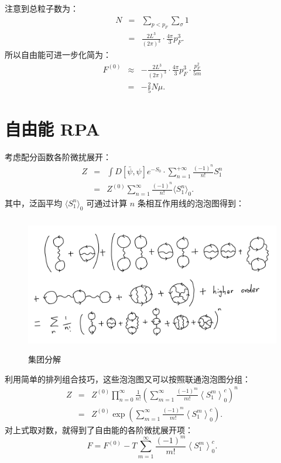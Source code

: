 \documentclass[10pt,UTF8]{ctexart}
\begin{document}
注意到总粒子数为：
\begin{eqnarray}
	N & = & \sum_{p<p_{F}}\sum_{\sigma}1\\
 	& = & \frac{2L^{3}}{\left(2\pi\right)^{3}}\cdot\frac{4\pi}{3}p_{F}^{3}.
\end{eqnarray}
所以自由能可进一步化简为：
\begin{eqnarray}
	F^{\left(0\right)} 
	& \approx & -\frac{2L^{3}}{\left(2\pi\right)^{3}}\cdot\frac{4\pi}{3}p_{F}^{3}\cdot\frac{p_{F}^{2}}{5m}\\
 	& = & -\frac{2}{5}N\mu.
\end{eqnarray}


\section*{自由能 RPA}
\noindent
考虑配分函数各阶微扰展开：
\begin{eqnarray}
	Z &=& \int D[\bar\psi,\psi] e^{-S_{0}}\cdot\sum_{n=1}^{+\infty}\frac{(-1)^n}{n!}S_1^n \\
	&=& Z^{(0)}\sum_{n=1}^{\infty} \frac{(-1)^n}{n!} \langle S_1^n \rangle_0.
\end{eqnarray}
其中，泛函平均 $\langle S_1^n \rangle_0$ 可通过计算 $n$ 条相互作用线的泡泡图得到：

\begin{figure}[H]
\begin{centering}
\includegraphics[height=6cm]{include/cluster}
\par\end{centering}
\caption{集团分解}
\end{figure}
\noindent
利用简单的排列组合技巧，这些泡泡图又可以按照联通泡泡图分组：
\begin{eqnarray}
Z & = & Z^{(0)}\prod_{n=0}^{\infty}\frac{1}{n!}\left(\sum_{m=1}^{\infty}\frac{\left(-1\right)^{m}}{m!}\left\langle S_{1}^{m}\right\rangle _{0}^{c}\right)^{n}\\
 & = & Z^{(0)}\exp\left(\sum_{m=1}^{\infty}\frac{\left(-1\right)^{m}}{m!}\left\langle S_{1}^{m}\right\rangle _{0}^{c}\right).
\end{eqnarray}
对上式取对数，就得到了自由能的各阶微扰展开项：
\begin{equation}
	F = F^{\left(0\right)}-T\sum_{m=1}^{\infty}\frac{\left(-1\right)^{m}}{m!}\left\langle S_{1}^{m}\right\rangle _{0}^{c}.
\end{equation}
\end{document}
